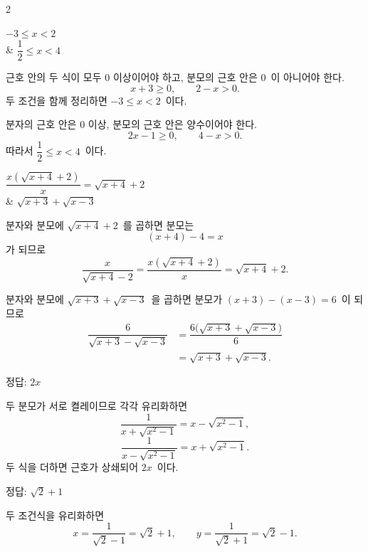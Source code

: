 \documentclass[10pt,fleqn]{article}
\begin{document}
\raggedcolumns
\begin{multicols*}{2}

\begin{dmanslist}
 $-3 \le x < 2$ \\
&  $\dfrac{1}{2}\le x < 4$
\end{dmanslist}

 근호 안의 두 식이 모두 $0$ 이상이어야 하고, 분모의 근호 안은 $0$\ 이 아니어야 한다.
\[ x+3 \ge 0,\qquad 2-x > 0. \]
두 조건을 함께 정리하면 $-3 \le x < 2$\ 이다.

 분자의 근호 안은 $0$ 이상, 분모의 근호 안은 양수이어야 한다.
\[ 2x-1 \ge 0,\qquad 4-x > 0. \]
따라서 $\dfrac{1}{2}\le x < 4$\ 이다.

\begin{dmanslist}
 $\dfrac{x(\sqrt{x+4}+2)}{x}=\sqrt{x+4}+2$ \\
&  $\sqrt{x+3}+\sqrt{x-3}$
\end{dmanslist}

 분자와 분모에 $\sqrt{x+4}+2$\ 를 곱하면 분모는
\[ (x+4)-4=x \]
가 되므로
\[ \dfrac{x}{\sqrt{x+4}-2}=\dfrac{x(\sqrt{x+4}+2)}{x}=\sqrt{x+4}+2. \]

 분자와 분모에 $\sqrt{x+3}+\sqrt{x-3}$\ 을 곱하면 분모가 $(x+3)-(x-3)=6$\ 이 되므로
\begin{align*}
\dfrac{6}{\sqrt{x+3}-\sqrt{x-3}}
&=\dfrac{6\bigl(\sqrt{x+3}+\sqrt{x-3}\bigr)}{6}\\
&=\sqrt{x+3}+\sqrt{x-3}.
\end{align*}

\begin{dmanswerbox}
정답: $2x$
\end{dmanswerbox}

두 분모가 서로 켤레이므로 각각 유리화하면
\[ \dfrac{1}{x+\sqrt{x^{2}-1}}=x-\sqrt{x^{2}-1}, \]
\[ \dfrac{1}{x-\sqrt{x^{2}-1}}=x+\sqrt{x^{2}-1}. \]
두 식을 더하면 근호가 상쇄되어 $2x$\ 이다.
\begin{dmanswerbox}
정답: $\sqrt{2}+1$
\end{dmanswerbox}

두 조건식을 유리화하면
\[ x=\dfrac{1}{\sqrt{2}-1}=\sqrt{2}+1,\qquad y=\dfrac{1}{\sqrt{2}+1}=\sqrt{2}-1. \]


\end{multicols*}
\end{document}
